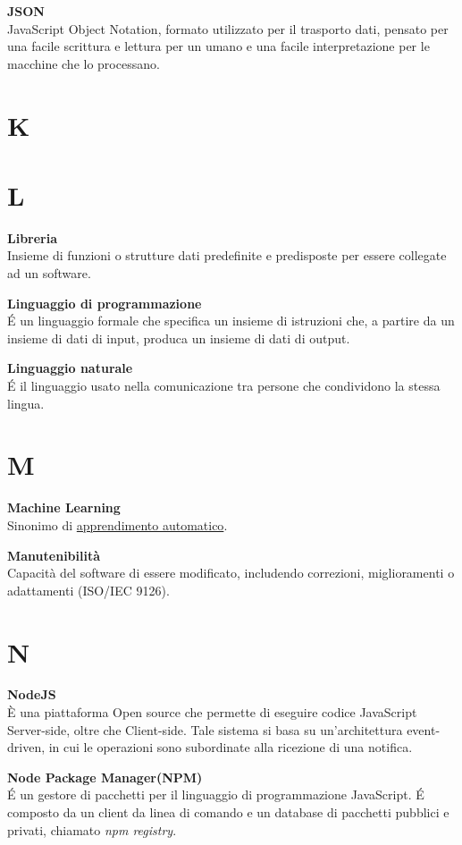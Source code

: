\documentclass[a4paper, oneside, openany, dvipsnames, table, 12pt]{article}
\begin{document}
\textbf{JSON} \\
JavaScript Object Notation, formato utilizzato per il trasporto dati, pensato
per una facile scrittura e lettura per un umano e una facile interpretazione per
le macchine che lo processano.

\newpage
\section{K}

\newpage
\section{L}
\textbf{Libreria} \\
Insieme di funzioni o strutture dati predefinite e predisposte per essere collegate ad un software. 

\textbf{Linguaggio di programmazione} \\
\'E un linguaggio formale che specifica un insieme di istruzioni che, a partire da un insieme di dati di input, produca un insieme di dati di output.

\textbf{Linguaggio naturale} \\
\'E il linguaggio usato nella comunicazione tra persone che condividono la stessa lingua.

\newpage
\section{M}
\textbf{Machine Learning} \\
Sinonimo di \hyperref[par:appr_auto]{apprendimento automatico}.

\textbf{Manutenibilità} \\
Capacità del software di essere modificato, includendo correzioni, miglioramenti o adattamenti (ISO/IEC 9126).

\newpage
\section{N}
\textbf{NodeJS}\\	
\`E una piattaforma Open source che permette di eseguire codice JavaScript Server-side, oltre che Client-side. Tale sistema si basa su un'architettura event-driven, in cui le operazioni sono subordinate alla ricezione di una notifica.

\textbf{Node Package Manager(NPM)} \\
\'E un gestore di pacchetti per il linguaggio di programmazione JavaScript.
\'E composto da un client da linea di comando e un database di pacchetti pubblici e privati, chiamato \textit{npm registry}. 
\end{document}
